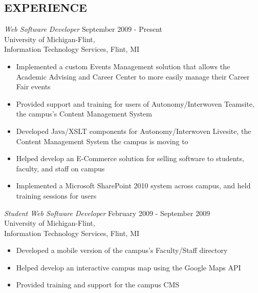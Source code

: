 \documentclass[line,margin]{res}
\begin{document}
\begin{resume}
\section{EXPERIENCE} {\sl Web Software Developer } \hfill September 2009 - Present \\
                University of Michigan-Flint, \\
                Information Technology Services, Flint, MI
                \vspace{2 mm}
                 \begin{itemize}
                    \item Implemented a custom Events Management solution that
                          allows the Academic Advising and Career Center to
                          more easily manage their Career Fair events
                    \item Provided support and training for users of Autonomy/Interwoven
                          Teamsite, the campus's Content Management System
                    \item Developed Java/XSLT components for Autonomy/Interwoven Livesite, the
                          Content Management System the campus is moving to
                    \item Helped develop an E-Commerce solution for selling software
                          to students, faculty, and staff on campus
                    \item Implemented a Microsoft SharePoint 2010 system across
                          campus, and held training sessions for users \\
                \end{itemize}

                {\sl Student Web Software Developer } \hfill February 2009 - September 2009 \\
                University of Michigan-Flint, \\
                Information Technology Services, Flint, MI
                \vspace{2 mm}
                 \begin{itemize}
                    \item Developed a mobile version of the campus's Faculty/Staff
                            directory
                    \item Helped develop an interactive campus map using the
                            Google Maps API
                    \item Provided training and support for the campus CMS
                 \end{itemize}


\end{resume}
\end{document}
